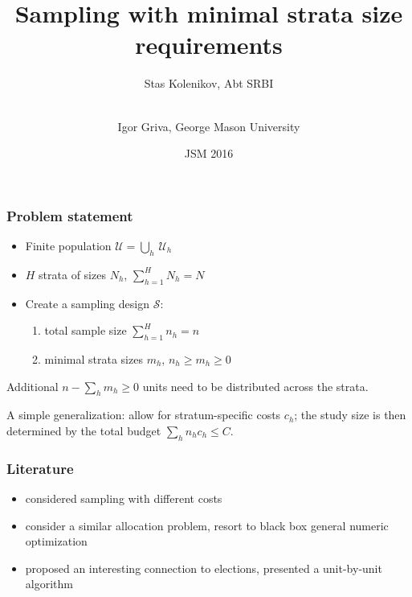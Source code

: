 \documentclass[final,hyperref={pdfpagelabels=false}]{beamer}
\begin{document}
\title{Sampling with minimal strata size requirements}

\author{Stas Kolenikov, Abt SRBI
\and \\
Igor Griva, George Mason University}
\date{JSM 2016}
\institute{}



\begin{frame}
\maketitle
\end{frame}

\begin{frame}\frametitle{Problem statement}

\begin{itemize}
\item Finite population $\mathcal U=\bigcup_h \, \mathcal U_h$
\item $H$ strata of sizes $N_h$, $\sum_{h=1}^H N_h = N$
\item Create a sampling design $\mathcal S$:
    \begin{enumerate}
        \item total sample size $\sum_{h=1}^H n_h = n$
        \item minimal strata sizes $m_h$, $n_h \ge m_h \ge 0$
    \end{enumerate}
\end{itemize}

Additional $n-\sum_h m_h \ge 0$ units need to
be distributed across the strata.

\bigskip

A simple generalization: allow for stratum-specific costs $c_h$;
the study size is then determined by the total budget
$\sum_h n_h c_h \le C$.

\end{frame}

\begin{frame}\frametitle{Literature}

\begin{itemize}
\item {} considered sampling with different costs
\item {} consider a similar allocation problem,
resort to black box general numeric optimization
\item {} proposed an interesting connection to elections, presented
a unit-by-unit algorithm
\end{itemize}

\end{frame}
\end{document}
